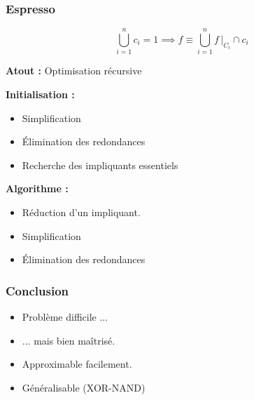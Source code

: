 \documentclass[handout]{beamer}
\begin{document}
\begin{frame}
  \frametitle{Espresso}

  \[ \bigcup_{i=1}^n c_i = 1 \implies f \equiv \bigcup_{i=1}^{n} f\,|_{C_i} \cap c_i \]

  \textbf{Atout :} Optimisation récursive

  \textbf{Initialisation :}
  
  \begin{itemize}
  \item Simplification
  \item Élimination des redondances
  \item Recherche des impliquants essentiels
  \end{itemize}

  \textbf{Algorithme :}
  \begin{itemize}
  \item Réduction d'un impliquant.
  \item Simplification
  \item Élimination des redondances
  \end{itemize}
  
\end{frame}

\begin{frame}
  \frametitle{Conclusion}

  \begin{itemize}
  \item Problème difficile ...
  \item ... mais bien maîtrisé.
  \item Approximable facilement.
  \item Généralisable (XOR-NAND)

  \end{itemize}

\end{frame}
\end{document}
